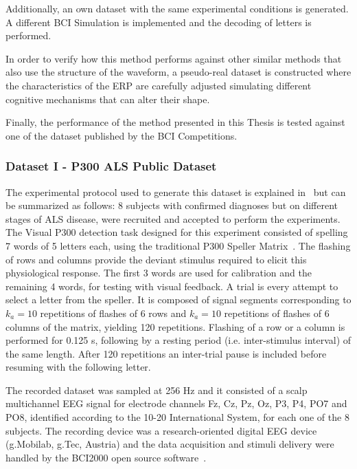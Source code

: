Additionally, an own dataset with the same experimental conditions is generated.  A different BCI Simulation is implemented and the decoding of letters is performed. 

In order to verify how this method performs against other similar methods that also use the structure of the waveform, a pseudo-real dataset is constructed where the characteristics of the ERP are carefully adjusted simulating different cognitive mechanisms that can alter their shape.

Finally, the performance of the method presented in this Thesis is tested against one of the dataset published by the BCI Competitions. 

\subsubsection{Dataset I - P300 ALS Public Dataset} \label{ALSDataset}

The experimental protocol used to generate this dataset is explained in~\cite{Riccio2013} but can be summarized as follows:  8 subjects with confirmed diagnoses but on different stages of ALS disease, were recruited and accepted to perform the experiments. The Visual P300 detection task designed for this experiment consisted of spelling 7 words of 5 letters each, using the traditional P300 Speller Matrix~\cite{Farwell1988}. The flashing of rows and columns provide the deviant stimulus required to elicit this physiological response.  The first 3 words are used for calibration and the remaining 4 words, for testing with visual feedback.  A trial is every attempt to select a letter from the speller. It is composed of signal segments corresponding to $k_a =10$ repetitions of flashes of 6 rows and $k_a =10$ repetitions of flashes of 6 columns of the matrix, yielding 120 repetitions.  Flashing of a row or a column is performed for 0.125 s, following by a resting period (i.e. inter-stimulus interval) of the same length.  After 120 repetitions an inter-trial pause is included before resuming with the following letter.

The recorded dataset was sampled at 256 Hz and it consisted of a scalp multichannel EEG signal for electrode channels Fz, Cz, Pz, Oz, P3, P4, PO7 and PO8, identified according to the 10-20 International System,  for each one of the 8 subjects.   The recording device was a research-oriented digital EEG device (g.Mobilab, g.Tec, Austria) and the data acquisition and stimuli delivery were handled by the BCI2000 open source software~\cite{Schalk2004}.

